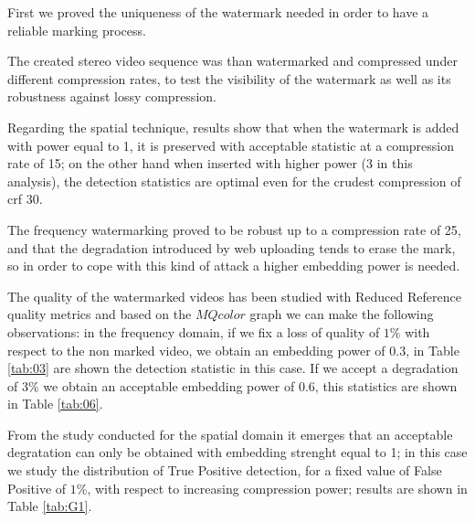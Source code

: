 First we proved the uniqueness of the watermark needed in order to have a reliable marking process.

The created stereo video sequence was than watermarked and compressed under different compression rates, to test the visibility of the watermark as well as its robustness against lossy compression.

Regarding the spatial technique, results show that when the watermark is added with power equal to 1, it is preserved with acceptable statistic at a compression rate of 15; on the other hand when inserted with higher power (3 in this analysis), the detection statistics are optimal even for the crudest compression of crf 30. 

The frequency watermarking proved to be robust up to a compression rate of 25, and that the degradation introduced by web uploading tends to erase the mark, so in order to cope with this kind of attack a higher embedding power is needed.

The quality of the watermarked videos has been studied with Reduced Reference quality metrics \cite{QMETRICS} and based on the $MQcolor$ graph we can make the following observations: in the frequency domain, if we fix a loss of quality of $1\%$ with respect to the non marked video, we obtain an embedding power of $0.3$, in Table \ref{tab:03} are shown the detection statistic in this case. If we accept a degradation of $3\%$ we obtain an acceptable embedding power of $0.6$, this statistics are shown in Table  \ref{tab:06}. 

From the study conducted for the spatial domain it emerges that an acceptable degratation can only be obtained with embedding strenght equal to 1; in this case we study the distribution of True Positive detection, for a fixed value of False Positive of $1\%$, with respect to increasing compression power; results are shown in Table \ref{tab:G1}.


\begin{table}[htbp]
 
 \begin{center}
 \caption{Detection statistic for a quality degradation of $1\%$\label{tab:03}}
 \end{center}
 \end{table}
 

